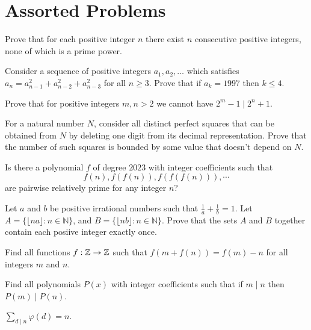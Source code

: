 \section{Assorted Problems}
\begin{problem}{\label{p:n:n:pr:1}}
  Prove that for each positive integer $n$ there exist $n$ consecutive
    positive integers, none of which is a prime power.
\end{problem}
\begin{problem}{\label{p:n:n:pr:2}}
  Consider a sequence of positive integers $a_1,a_2,\ldots$ which satisfies
    $a_n=a_{n-1}^2+a_{n-2}^2+a_{n-3}^2$ for all $n\ge 3$. Prove that if
    $a_k=1997$ then $k\le 4$.
\end{problem}
\begin{problem}{\label{p:n:n:pr:2b}}
      Prove that for positive integers $m,n>2$ we cannot have $2^m-1\mid
        2^n+1$.
\end{problem}
\begin{problem}{\label{p:n:n:pr:3}}
   For a natural number $N$, consider all distinct perfect squares that
    can be obtained from $N$ by deleting one digit from its decimal
    representation. Prove that the number of such squares is bounded by some
    value that doesn't depend on $N$.
\end{problem}
\begin{problem}{\label{p:n:n:pr:4}}
  Is there a polynomial $f$ of degree $2023$ with integer
    coefficients such that \[f(n), f(f(n)), f(f(f(n))), \cdots\] are pairwise
    relatively prime for any integer $n$?
\end{problem}
\begin{problem}{\label{p:n:n:pr:5}}
  Let $a$ and $b$ be positive irrational numbers such that $\frac 1a+\frac 1b=1$.
    Let $A=\{\lfloor na\rfloor: n\in\mathbb N\}$, and $B=\{\lfloor nb\rfloor:
    n\in\mathbb N\}$. Prove that the sets $A$ and $B$ together contain each
    posiive integer exactly once.
\end{problem}
\begin{problem}{\label{p:n:n:pr:6}}
  Find all functions $f:\mathbb{Z}\to\mathbb{Z}$ such that $f(m+f(n))=f(m)-n$ for all
    integers $m$ and $n$.
\end{problem}
\begin{problem}{\label{p:n:n:pr:7}}
  Find all polynomials $P(x)$ with integer coefficients such that if
    $m\mid n$ then $P(m)\mid P(n)$.
\end{problem}
\begin{result}{\label{r:n:n:pr:1}}
    $\displaystyle\sum_{d\mid n}\varphi(d)=n$.
\end{result}
